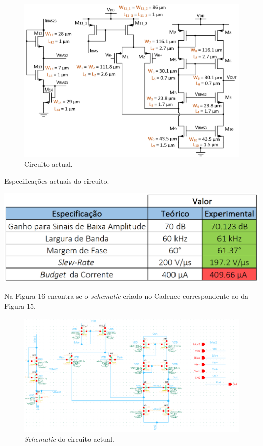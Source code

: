 \documentclass[11pt]{article}
\numberwithin{equation}{section}
\begin{document}
\begin{figure}[H]
	\centering
	\includegraphics[keepaspectratio=true, scale=0.70]{teoricas/ajustesF1}
	\vspace{-0.5em}
	\caption{Circuito actual.}
	\vspace{-0.8em}
\end{figure}

\begin{table}[H]
	\centering
	\caption{Especificações actuais do circuito.}
	\vspace{-1.5mm}
	\includegraphics[keepaspectratio=true, scale=0.40]{teoricas/specsajustesF1}
\end{table}

Na Figura 16 encontra-se o \textit{schematic} criado no Cadence correspondente ao da Figura 15.

\begin{figure}[H]
	\centering
	\includegraphics[keepaspectratio=true, scale=0.75]{exps/schematicajustesF1}
	\vspace{-0.5em}
	\caption{\textit{Schematic} do circuito actual.}
	\vspace{-0.8em}
\end{figure} 
\end{document}
